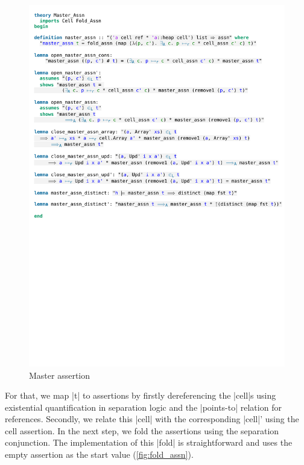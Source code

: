 \begin{figure}[htpb]
    \includegraphics[trim={0 26,3cm 0 2cm}, clip, width=1.00\textwidth]{figures/Theory_Master_Assn.pdf}
    \caption[Master assertion]{Master assertion}
    \label{fig:master_assn}
\end{figure}

\noindent For that, we map |t| to assertions by firstly dereferencing the |cell|s using existential quantification in separation logic and the |points-to| relation for references. Secondly, we relate this |cell| with the corresponding |cell|’ using the cell assertion.
In the next step, we fold the assertions using the separation conjunction. The implementation of this |fold| is straightforward and uses the empty assertion as the start value (\autoref{fig:fold_assn}).

